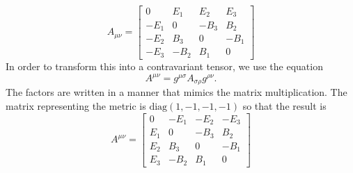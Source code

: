 \begin{enumerate}
\begin{equation}
A_{\mu\nu} = 
\begin{bmatrix}
0 & E_1 & E_2 & E_3 \\
-E_1 & 0 & -B_3 & B_2\\
-E_2 & B_3 & 0 & -B_1\\
-E_3 & -B_2 & B_1 & 0
\end{bmatrix}
\end{equation}
In order to transform this into a contravariant tensor, we use the equation
\begin{equation}\label{c3e76}
A^{\mu\nu} = g^{\mu\sigma}A_{\sigma\rho}g^{\rho\nu}.
\end{equation}
The factors are written in a manner that mimics the matrix multiplication. The matrix
representing the metric is $\text{diag}(1, -1, -1, -1)$ so that the result is
\begin{equation}\label{c3e77}
A^{\mu\nu} = 
\begin{bmatrix}
0 & -E_1 & -E_2 & -E_3 \\
E_1 & 0 & -B_3 & B_2\\
E_2 & B_3 & 0 & -B_1\\
E_3 & -B_2 & B_1 & 0
\end{bmatrix}
\end{equation}

\end{enumerate}

